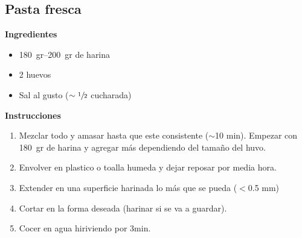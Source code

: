 \subsection{Pasta fresca}
\textbf{Ingredientes}
\begin{itemize}
\item \SIrange{180}{200}{gr} de harina
\item 2 huevos
\item Sal al gusto ($\sim \sfrac{1}{2}$ cucharada)
\end{itemize}

\textbf{Instrucciones}
\begin{enumerate}
\item Mezclar todo y amasar hasta que este consistente ($\sim$10 min). Empezar con \SI{180}{gr} de harina y agregar más dependiendo del tamaño del huvo.
\item Envolver en plastico o toalla humeda y dejar reposar por media hora.
\item Extender en una superficie harinada lo m\'as que se pueda ($<$0.5 mm)
\item Cortar en la forma deseada (harinar si se va a guardar).
\item Cocer en agua hiriviendo por 3min.
\end{enumerate}
